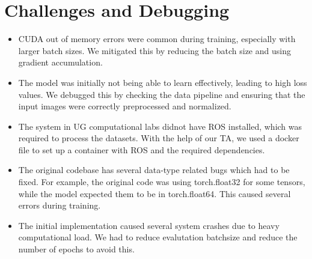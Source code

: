 \documentclass[12pt]{article}
\begin{document}
\section{Challenges and Debugging}
\begin{itemize}
    \item CUDA out of memory errors were common during training, especially with larger batch sizes. We mitigated this by reducing the batch size and using gradient accumulation.
    \item The model was initially not being able to learn effectively, leading to high loss values. We debugged this by checking the data pipeline and ensuring that the input images were correctly preprocessed and normalized.
    \item The system in UG computational labs didnot have ROS installed, which was required to process the datasets. With the help of our TA, we used a docker file to set up a container with ROS and the required dependencies.
    \item The original codebase has several data-type related bugs which had to be fixed. For example, the original code was using torch.float32 for some tensors, while the model expected them to be in torch.float64. This caused several errors during training.
    \item The initial implementation caused several system crashes due to heavy computational load. We had to reduce evalutation batchsize and reduce the number of epochs to avoid this.
\end{itemize}
\newpage
\end{document}
